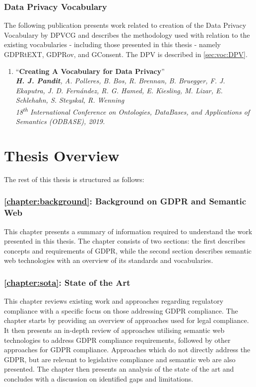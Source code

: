 \subsubsection{Data Privacy Vocabulary}
The following publication presents work related to creation of the Data Privacy Vocabulary by DPVCG and describes the methodology used with relation to the existing vocabularies - including those presented in this thesis - namely GDPRtEXT, GDPRov, and GConsent. The DPV is described in \autoref{sec:voc:DPV}.
\begin{enumerate}[resume]
    \item ``\textbf{Creating A Vocabulary for Data Privacy}'' \cite{pandit_creating_2019} \\
    \textit{\textbf{H. J. Pandit}, A. Polleres, B. Bos, R. Brennan, B. Bruegger, F. J. Ekaputra, J. D. Fernández, R. G. Hamed, E. Kiesling, M. Lizar, E. Schlehahn, S. Steyskal, R. Wenning} \\
    \textit{18\textsuperscript{th} International Conference on Ontologies, DataBases, and Applications of Semantics (ODBASE), 2019.}
\end{enumerate}


\section{Thesis Overview}
The rest of this thesis is structured as follows:

\subsubsection*{\autoref{chapter:background}: Background on GDPR and Semantic Web}
This chapter presents a summary of information required to understand the work presented in this thesis. The chapter consists of two sections: the first describes concepts and requirements of GDPR, while the second section describes semantic web technologies with an overview of its standards and vocabularies.

\subsubsection*{\autoref{chapter:sota}: State of the Art}
This chapter reviews existing work and approaches regarding regulatory compliance with a specific focus on those addressing GDPR compliance. The chapter starts by providing an overview of approaches used for legal compliance. It then presents an in-depth review of approaches utilising semantic web technologies to address GDPR compliance requirements, followed by other approaches for GDPR compliance. Approaches which do not directly address the GDPR, but are relevant to legislative compliance and semantic web are also presented. The chapter then presents an analysis of the state of the art and concludes with a discussion on identified gaps and limitations.

